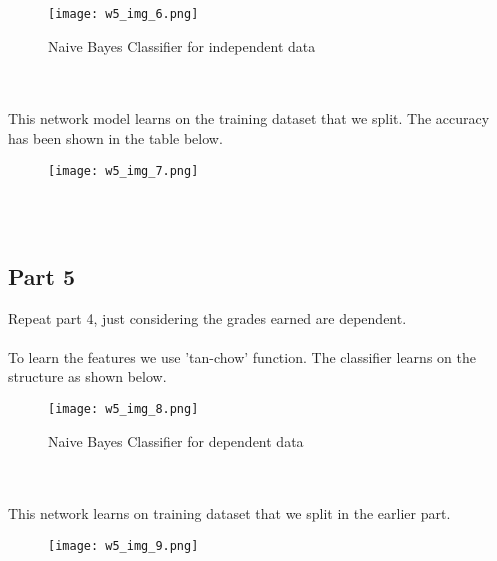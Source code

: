 \documentclass[conference]{IEEEtran}
\begin{document}
\begin{figure}[htbp]
\centerline{\texttt{[image: w5\_img\_6.png]}}
\caption{Naive Bayes Classifier for independent data}
\label{fig}
\end{figure}

\\
\\
This network model learns on the training dataset that we split. The accuracy has been shown in the table below.

\begin{figure}[htbp]
\centerline{\texttt{[image: w5\_img\_7.png]}}

\label{fig}
\end{figure}
\\
\\
\subsection{Part 5}
Repeat part 4, just considering the grades earned are dependent.
\\
\\
To learn the features we use 'tan-chow' function. The classifier learns on the structure as shown below.

\begin{figure}[htbp]
\centerline{\texttt{[image: w5\_img\_8.png]}}
\caption{Naive Bayes Classifier for dependent data}
\label{fig}
\end{figure}
\\
\\
This network learns on training dataset that we split in the earlier part.

\begin{figure}[htbp]
\centerline{\texttt{[image: w5\_img\_9.png]}}

\label{fig}
\end{figure}
\end{document}
